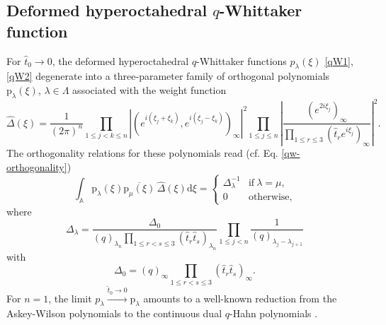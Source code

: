 \documentclass[reqno]{amsart}
\theoremstyle{remark}
\numberwithin{equation}{section}
\begin{document}
\subsection{Deformed hyperoctahedral $q$-Whittaker function}
For $\hat{t}_0\to 0$,  the deformed hyperoctahedral $q$-Whittaker functions $p_\lambda (\xi)$ \eqref{qW1}, \eqref{qW2} degenerate into a three-parameter  family of orthogonal polynomials
$\text{p}_\lambda(\xi)$, $\lambda\in\Lambda$
associated with the weight function
\begin{equation*}
\hat{\Delta} (\xi )=\frac{1}{(2\pi)^n}
\prod_{1\leq j<k\leq n}  \left| (e^{i(\xi_j+\xi_k)},e^{i(\xi_j-\xi_k)})_\infty \right|^2
\prod_{1\leq j\leq n}\left|
\frac{(e^{2i\xi_j})_\infty}{\prod_{1\leq r\leq 3} (\hat{t}_r e^{i\xi_j})_\infty}   \right|^2 .
\end{equation*}
The orthogonality relations for these polynomials read (cf. Eq. \eqref{qw-orthogonality})
\begin{equation}
\int_{\mathbb{A}} \text{p}_\lambda (\xi )\overline{ \text{p}_\mu (\xi)}\, \hat{\Delta}(\xi)\text{d}\xi =
\begin{cases}
{\Delta}_\lambda^{-1} &\text{if}\ \lambda =\mu ,\\
0&\text{otherwise},
\end{cases}
\end{equation}
where
\begin{equation*}
{\Delta}_\lambda= \frac{{\Delta}_0}{(q)_{\lambda_n}\prod_{1\leq r<s\leq 3} (\hat{t}_r\hat{t}_s)_{\lambda_n}}
\prod_{1\leq j<n}\frac{1}{(q)_{\lambda_j-\lambda_{j+1}}} 
\end{equation*}
with
\begin{equation*}
{\Delta}_0=(q)_\infty \prod_{1\leq r<s\leq 3} (\hat{t}_r\hat{t}_s)_\infty  .
\end{equation*}
For $n=1$, the limit $p_\lambda\stackrel{\hat{t}_0\to 0}{\longrightarrow} \text{p}_\lambda$ amounts to a well-known reduction from the Askey-Wilson polynomials to the continuous dual $q$-Hahn polynomials \cite{koe-les-swa:hypergeometric}.
\end{document}
